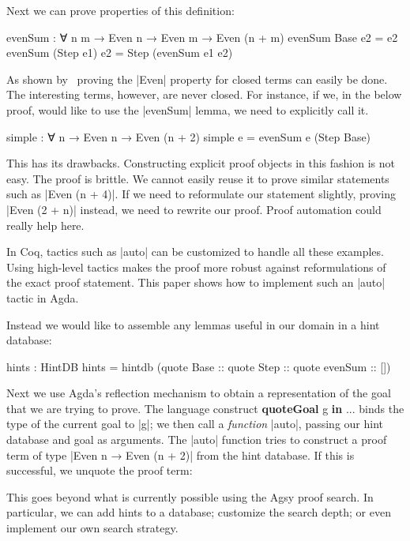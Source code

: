 \documentclass[preprint]{sigplanconf}
\begin{document}
Next we can prove properties of this definition:

\begin{code}
  evenSum : ∀ {n m} → Even n → Even m → Even (n + m)
  evenSum  Base     e2 = e2
  evenSum (Step e1) e2 = Step (evenSum e1 e2)
\end{code}

As shown by~\citet{van-der-walt} proving the |Even| property for closed
terms can easily be done. The interesting terms, however, are never closed.
For instance, if we, in the below proof, would like to use the |evenSum|
lemma, we need to explicitly call it.

\begin{code}
  simple : ∀ {n} → Even n → Even (n + 2)
  simple e =  evenSum e (Step Base)
\end{code}

This has its drawbacks. Constructing explicit proof objects in this
fashion is not easy. The proof is brittle. We cannot easily reuse it
to prove similar statements such as |Even (n + 4)|. If we need to
reformulate our statement slightly, proving |Even (2 + n)| instead, we
need to rewrite our proof. Proof automation could really help here.

In Coq, tactics such as |auto| can be customized to handle all these
examples. Using high-level tactics makes the proof more robust against
reformulations of the exact proof statement. This paper shows how to
implement such an |auto| tactic in Agda.

Instead we would like to assemble any lemmas useful in our domain in a
hint database:

\begin{code}
  hints : HintDB
  hints = hintdb (quote Base
                  :: quote Step
                  :: quote evenSum
                  :: [])
\end{code}

Next we use Agda's reflection mechanism to obtain a representation of
the goal that we are trying to prove. The language construct \textbf{quoteGoal}
g \textbf{in} ... binds the type of the current goal to |g|; we then call a
\emph{function} |auto|, passing our hint database and goal as arguments.
The |auto| function tries to construct a proof term of type |Even n → Even
(n + 2)| from the hint database. If this is successful, we unquote the
proof term:

This goes beyond what is currently possible using the Agsy proof search.
In particular, we can add hints to a database; customize the search depth;
or even implement our own search strategy.
\end{document}
